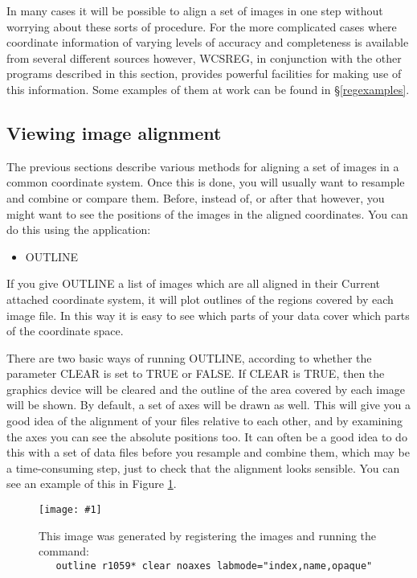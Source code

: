 \documentclass[twoside,11pt]{article}
\newcommand{\htmladdimg}[1]{}
\newcommand{\hyperref}[4]{#2\ref{#4}#3}
\newcommand{\htmlref}[2]{#1}
\newcommand{\xlabel}[1]{}
\renewcommand{\_}{\texttt{\symbol{95}}}
\newcommand{\routine}[1]{{\sc #1}}
\newcommand{\xroutine}[1]{\htmlref{{\sc #1}}{#1}}
\newcommand{\myfig} [5] {
  \begin{figure}
    \centering\texttt{[image: \#1]}
    \typeout{#1 inserted on page \arabic{page}}
    \caption{\label{#4}#5}
  \end{figure}
  }
\newcommand{\myfig}[5]{
    \htmladdimg{#3}\\
    Figure: \label{#4} #5
    }
\begin{document}
In many cases it will be possible to align a set of images in
one step without worrying about these sorts of procedure.
For the more complicated cases where 
coordinate information of varying levels of 
accuracy and completeness is available from several
different sources however,
\routine{WCSREG}, in conjunction with the other programs described
in this section, provides powerful facilities for making use of
this information.  Some examples of them at work can be found
in \hyperref{the examples section}{\S }{}{regexamples}.


\subsection{\xlabel{view-align}\label{view-align}Viewing image alignment}

The previous sections describe various methods for aligning 
a set of images in a common coordinate system.  
Once this is done, you will usually want to resample and combine
or compare them.
Before, instead of, or after that however, you might want to see
the positions of the images in the aligned coordinates. 
You can do this using the application:
\begin{itemize}
\item \xroutine{OUTLINE}
\end{itemize}
If you give \routine{OUTLINE} 
a list of images which are all aligned in their 
Current attached coordinate system, it will plot
outlines of the regions covered by each image file.  
In this way it is easy to see 
which parts of your data cover which parts of the coordinate space.

There are two basic ways of running \routine{OUTLINE}, according
to whether the parameter CLEAR is set to TRUE or FALSE.
If CLEAR is TRUE, then the graphics device will be cleared and
the outline of the area covered by each image will be shown.
By default, a set of axes will be drawn as well.
This will 
give you a good idea of the alignment of your files relative to
each other, and by examining the axes you can see the absolute
positions too.  It can often be a good idea to do this with 
a set of data files before you resample and combine them,
which may be a time-consuming step, just
to check that the alignment looks sensible.
You can see an example of this in Figure \ref{OUTCLEAR}.

\myfig{sun139outclear.eps}{height=0.5\textheight}{outclear.gif}{OUTCLEAR}{
This image was generated by registering the images and running the 
command:\protect\\
{\tt\ \ \ outline r1059* clear noaxes labmode="index,name,opaque"}}
\end{document}

